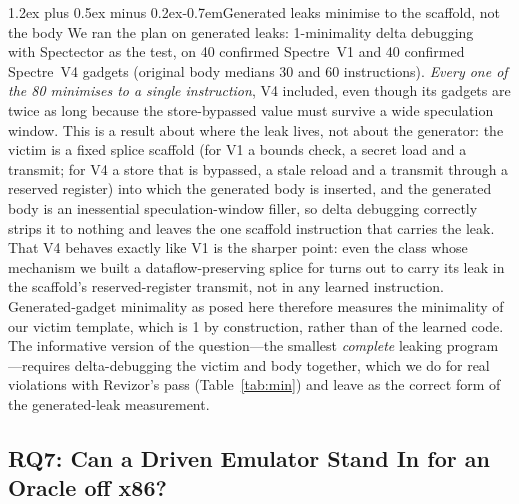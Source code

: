 \documentclass[conference]{IEEEtran}
\makeatletter
\renewcommand\paragraph{\@startsection{paragraph}{4}{\z@}%
  {1.2ex plus 0.5ex minus 0.2ex}{-0.7em}{\normalfont\normalsize\bfseries}}
\makeatother
\begin{document}
\paragraph{Generated leaks minimise to the scaffold, not the body}
We ran the plan on generated leaks: 1-minimality delta
debugging~\cite{ddmin} with Spectector as the test, on 40 confirmed Spectre~V1
and 40 confirmed Spectre~V4 gadgets (original body medians 30 and 60
instructions). \emph{Every one of the 80 minimises to a single instruction},
V4 included, even though its gadgets are twice as long because the
store-bypassed value must survive a wide speculation window. This is a result
about where the leak lives, not about the generator: the victim is a fixed
splice scaffold (for V1 a bounds check, a secret load and a transmit; for V4 a
store that is bypassed, a stale reload and a transmit through a reserved
register) into which the generated body is inserted, and the generated body is
an inessential speculation-window filler, so delta debugging correctly strips
it to nothing and leaves the one scaffold instruction that carries the leak.
That V4 behaves exactly like V1 is the sharper point: even the class whose
mechanism we built a dataflow-preserving splice for turns out to carry its leak
in the scaffold's reserved-register transmit, not in any learned instruction.
Generated-gadget minimality as posed here therefore measures the minimality of
our victim template, which is 1 by construction, rather than of the learned
code. The informative version of the question---the smallest \emph{complete}
leaking program---requires delta-debugging the victim and body together, which
we do for real violations with Revizor's pass (Table~\ref{tab:min}) and leave
as the correct form of the generated-leak measurement.


\subsection{RQ7: Can a Driven Emulator Stand In for an Oracle off x86?}
\label{sec:specemu-results}
\end{document}

